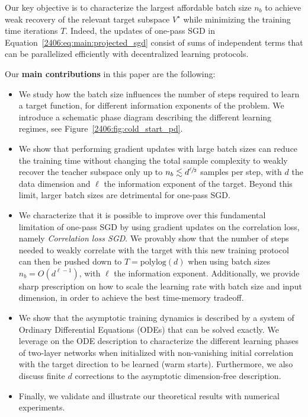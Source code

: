 Our key objective is to characterize the largest affordable batch size $n_b$ to achieve weak recovery of the relevant target subspace $V^\star$ while minimizing the training time iterations $T$. Indeed, the updates of one-pass SGD in Equation~\eqref{2406:eq:main:projected_sgd} consist of sums of independent terms that can be parallelized efficiently with decentralized learning protocols.

Our \textbf{main contributions} in this paper are the following:
\begin{itemize}
    \item We study how the batch size influences the number of steps required to learn a target function, for different information exponents of the problem. We introduce a schematic phase diagram describing the different learning regimes, see Figure~\ref{2406:fig:cold_start_pd}. 
    
    \item We show that performing gradient updates with large batch sizes can reduce the training time without changing the total sample complexity to weakly recover the teacher subspace only up to \(n_b \lesssim d^{\sfrac{\ell}{2}}\) samples per step, with \(d\) the data dimension and $\ell$ the information exponent of the target. Beyond this limit, larger batch sizes are detrimental for one-pass SGD.
    
     \item We characterize that it is possible to improve over this fundamental limitation of one-pass SGD by using gradient updates on the correlation loss, namely  \textit{Correlation loss SGD}. We provably show that the number of steps needed to weakly correlate with the target with this new training protocol can then be pushed down to \(T=\mathrm{polylog}(d)\) when using batch sizes $n_b = O(d^{\ell -1})$, with $\ell$ the information exponent.
     Additionally, we provide sharp prescription on how to scale the learning rate with batch size and input dimension, in order to achieve the best time-memory tradeoff.
     
    \item We show that the asymptotic training dynamics is described by a system of Ordinary Differential Equations (ODEs) that can be solved exactly. We leverage on the ODE description to characterize the different learning phases of two-layer networks when initialized with non-vanishing initial correlation with the target direction to be learned (warm starts). Furthermore, we also discuss finite \(d\) corrections to the asymptotic dimension-free description. 
    
    \item Finally, we validate and illustrate our theoretical results with numerical experiments.
\end{itemize}

